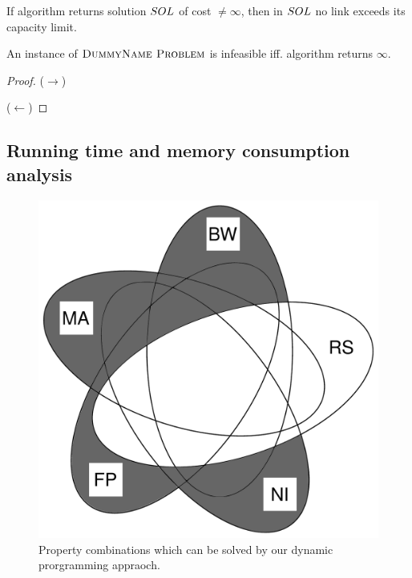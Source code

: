 \begin{lemma}
  If algorithm returns solution $SOL$ of cost $\neq \infty$, then in $SOL$ no link exceeds its capacity limit.
  \end{lemma}

\begin{lemma}
An instance of $\textsc{DummyName Problem}$ is infeasible iff. algorithm returns $\infty$.
\end{lemma}
\begin{proof}
  ($\rightarrow$)

  ($\leftarrow$)
  \end{proof}


\subsection{Running time and memory consumption analysis}

\begin{figure}
\includegraphics[width=\columnwidth]{figs/venn_dp.pdf}
\caption{Property combinations which can be solved by our dynamic prorgramming 
appraoch.}
\label{fig:venn_dp}
\end{figure}

